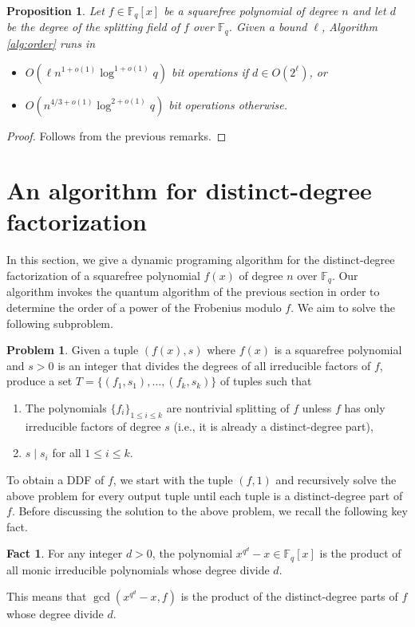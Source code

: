 \documentclass{article}
\theoremstyle{plain}
\newtheorem{proposition}[theorem]{Proposition}
\theoremstyle{definition}
\newtheorem*{problem}{Problem}
\newtheorem*{fact}{Fact}
\def\F{\ensuremath{\mathbb{F}}}
\begin{document}
\begin{proposition}
	\label{prop:exact-d}
	Let $f \in \F_q[x]$ be a squarefree polynomial of degree $n$ and let $d$ be the degree of the 
	splitting field of $f$ over $\F_q$. Given a bound $\ell$, Algorithm \ref{alg:order} runs in
	\begin{itemize}
		\item $O(\ell n^{1 + o(1)}\log^{1 + o(1)}q)$ bit operations if $d \in O(2^\ell)$, or
		\item $O(n^{4 / 3 + o(1)}\log^{2 + o(1)}q)$ bit operations otherwise.
	\end{itemize}
\end{proposition}
\begin{proof}
	Follows from the previous remarks.
\end{proof}



\section{An algorithm for distinct-degree factorization}

In this section, we give a dynamic programing algorithm for the distinct-degree factorization of a 
squarefree polynomial $f(x)$ of degree $n$ over $\F_q$. Our algorithm invokes the quantum algorithm 
of the previous section in order to determine the order of a power of the Frobenius modulo $f$. We 
aim to solve the following subproblem.
\begin{problem}
	Given a tuple $(f(x), s)$ where $f(x)$ is a squarefree polynomial and $s > 0$ is an integer 
	that divides the degrees of all irreducible factors of $f$, produce a set $T = \{ (f_1, s_1), 
	\dots, (f_k, s_k) \}$ of tuples such that 
	\begin{enumerate}
		\item\label{cond:split} The polynomials $\{ f_i \}_{1 \le i \le k}$ are nontrivial 
		splitting of $f$ unless $f$ has only irreducible factors of degree $s$ (i.e., it is already 
		a distinct-degree part),
		\item\label{cond:div} $s \mid s_i$ for all $1 \le i \le k$.
	\end{enumerate}
\end{problem}
To obtain a DDF of $f$, we start with the tuple $(f, 1)$ and recursively solve the above problem 
for every output tuple until each tuple is a distinct-degree part of $f$. Before discussing the 
solution to the above problem, we recall the following key fact.
\begin{fact}
	For any integer $d > 0$, the polynomial $x^{q^d} - x \in \F_q[x]$ is the product of all monic 
	irreducible polynomials whose degree divide $d$. 
\end{fact}
This means that $\gcd(x^{q^d} - x, f)$ is the product of the distinct-degree parts of $f$ whose 
degree divide $d$.
\end{document}
